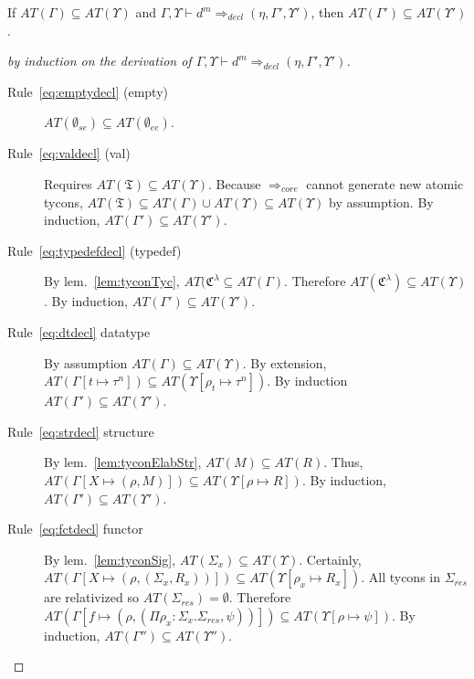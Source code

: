 \begin{lemma}\label{lem:tyconDecl}
If $AT(\Gamma) \subseteq AT(\Upsilon)$ and $\Gamma,\Upsilon\vdash d^m \Rightarrow_{decl} (\eta,\Gamma',\Upsilon')$, then $AT(\Gamma') \subseteq AT(\Upsilon')$. 
\end{lemma}
\begin{proof}[by induction on the derivation of $\Gamma,\Upsilon\vdash d^m \Rightarrow_{decl} (\eta,\Gamma',\Upsilon')$]
\begin{description}
\item[Rule~\ref{eq:emptydecl} (empty)] $AT(\emptyset_{se}) \subseteq AT(\emptyset_{ee})$. 
\item[Rule~\ref{eq:valdecl} (val)] Requires $AT(\mathfrak{T}) \subseteq AT(\Upsilon)$. Because $\Rightarrow_{core}$ cannot generate new atomic tycons, $AT(\mathfrak{T}) \subseteq AT(\Gamma) \cup AT(\Upsilon) \subseteq AT(\Upsilon)$ by assumption. By induction, $AT(\Gamma') \subseteq AT(\Upsilon')$. 
\item[Rule~\ref{eq:typedefdecl} (typedef)] By lem.~\ref{lem:tyconTyc}, $AT(\mathfrak{C}^\lambda \subseteq AT(\Gamma)$. Therefore $AT(\mathfrak{C}^\lambda) \subseteq AT(\Upsilon)$. By induction, $AT(\Gamma') \subseteq AT(\Upsilon')$. 

\item[Rule~\ref{eq:dtdecl} datatype] By assumption $AT(\Gamma)\subseteq AT(\Upsilon)$. By extension, $AT(\Gamma[t\mapsto \tau^n]) \subseteq AT(\Upsilon[\rho_t \mapsto \tau^n])$. By induction $AT(\Gamma') \subseteq AT(\Upsilon')$. 

\item[Rule~\ref{eq:strdecl} structure] By lem.~\ref{lem:tyconElabStr}, $AT(M) \subseteq AT(R)$. Thus, $AT(\Gamma[X\mapsto (\rho, M)]) \subseteq AT(\Upsilon[\rho\mapsto R])$. By induction, $AT(\Gamma') \subseteq AT(\Upsilon')$. 

\item[Rule~\ref{eq:fctdecl} functor] By lem.~\ref{lem:tyconSig}, $AT(\Sigma_x) \subseteq AT(\Upsilon)$. Certainly, $AT(\Gamma[X\mapsto (\rho,(\Sigma_x,R_x))]) \subseteq AT(\Upsilon[\rho_x\mapsto R_x])$. All tycons in $\Sigma_{res}$ are relativized so $AT(\Sigma_{res}) = \emptyset$. Therefore $AT(\Gamma[f\mapsto (\rho,(\Pi\rho_x:\Sigma_x.\Sigma_{res},\psi))]) \subseteq AT(\Upsilon[\rho\mapsto \psi])$. By induction, $AT(\Gamma'') \subseteq AT(\Upsilon'')$.  
\end{description}

\end{proof} 

